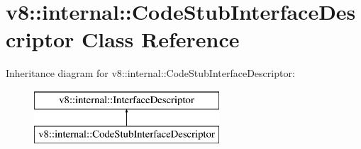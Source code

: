 \hypertarget{classv8_1_1internal_1_1_code_stub_interface_descriptor}{}\section{v8\+:\+:internal\+:\+:Code\+Stub\+Interface\+Descriptor Class Reference}
\label{classv8_1_1internal_1_1_code_stub_interface_descriptor}
Inheritance diagram for v8\+:\+:internal\+:\+:Code\+Stub\+Interface\+Descriptor\+:\begin{figure}[H]
\begin{center}
\leavevmode
\includegraphics[height=2.000000cm]{classv8_1_1internal_1_1_code_stub_interface_descriptor}
\end{center}
\end{figure}
